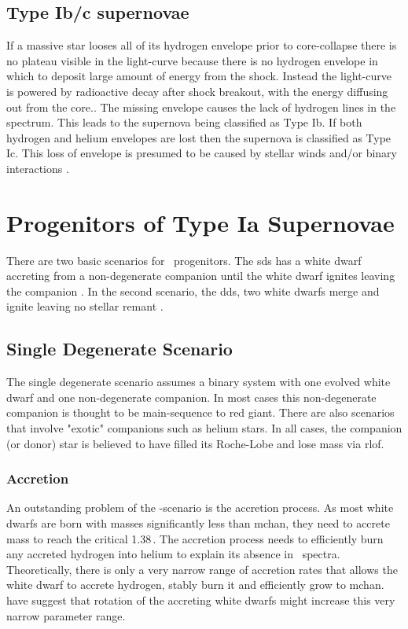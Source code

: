 \subsection{Type Ib/c supernovae}
If a massive star looses all of its hydrogen envelope prior to core-collapse there is no plateau visible in the light-curve because there is no hydrogen envelope in which to deposit large amount of energy from the shock. Instead the light-curve is powered by radioactive decay after shock breakout, with the energy diffusing out from the core.. The missing envelope causes the lack of hydrogen lines in the spectrum. This leads to the supernova being classified as Type Ib. If both hydrogen and helium envelopes are lost then the supernova is classified as Type Ic. 
This loss of envelope is presumed to be caused by stellar winds and/or binary interactions \citep{1992ApJ...391..246P}. 





\section{Progenitors of Type Ia Supernovae}
\label{sec:snia_progenitor}

There are two basic scenarios for \sneia\ progenitors. The \gls{sds} has a white dwarf accreting from a non-degenerate companion until the white dwarf ignites leaving the companion \citep[first introduced by]{1973ApJ...186.1007W}. In the second scenario,  the \gls{dds}, two white dwarfs merge and ignite leaving no stellar remant \citet[first suggested by][]{1984ApJ...277..355W,1984ApJS...54..335I}. 

\subsection{Single Degenerate Scenario}
The single degenerate scenario assumes a binary system with one evolved white dwarf and one non-degenerate companion. In most cases this non-degenerate companion is thought to be main-sequence to red giant. There are also scenarios that involve "exotic" companions such as helium stars. In all cases, the companion (or donor) star is believed to have filled its Roche-Lobe and lose mass via \gls{rlof}.

\subsubsection{Accretion}
An outstanding problem of the \sd-scenario is the accretion process.  As most white dwarfs are born with masses significantly less than \gls{mchan}, they need to accrete mass to reach the critical 1.38\,\msun. The accretion process needs to efficiently burn any accreted hydrogen into helium to  explain its absence in \sneia\ spectra. Theoretically, there is only a very narrow range of accretion rates that allows the white dwarf to accrete hydrogen, stably burn it and efficiently grow to \gls{mchan}. \cite{2004A&A...419..623Y} have suggest that rotation of the accreting white dwarfs might increase this very narrow parameter range.


